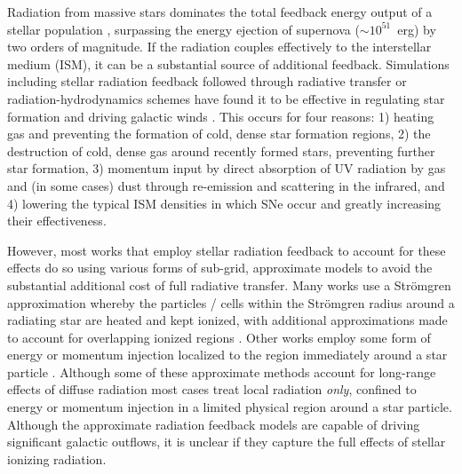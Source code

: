 \documentclass[twocolumn]{aastex62}
\begin{document}
Radiation from massive stars dominates the total feedback energy output of a stellar population \citep[e.g.][]{Leitherer1999,Agertz2013}, surpassing the energy ejection of supernova ($\sim 10^{51}$~erg) by two orders of magnitude. If the radiation couples effectively to the interstellar medium (ISM), it can be a substantial source of additional feedback. %
Simulations including stellar radiation feedback followed through radiative transfer or radiation-hydrodynamics schemes have found it to be effective in regulating star formation and driving galactic winds \citep[e.g.][]{WiseAbel2012,Kim2013a,Sales2014,Oshea2015,Rosdahl2015,Ocvirk2015,Pawlik2015,Peters2017}. This occurs for four reasons: 1) heating gas and preventing the formation of cold, dense star formation regions, 2) the destruction of cold, dense gas around recently formed stars, preventing further star formation, 3) momentum input by direct absorption of UV radiation by gas and (in some cases) dust through re-emission and scattering in the infrared, and 4) lowering the typical ISM densities in which SNe occur and greatly increasing their effectiveness. %

However, most works that employ stellar radiation feedback to account for these effects do so using various forms of sub-grid, approximate models to avoid the substantial additional cost of full radiative transfer. Many works use a Str{\"o}mgren approximation whereby the particles / cells within the Str{\"o}mgren radius around a radiating star are heated and kept ionized, with additional approximations made to account for overlapping ionized regions \citep[e.g.][]{HQM2011,Hu2016,Hu2017}. Other works employ some form of energy or momentum injection localized to the region immediately around a star particle \citep[e.g.][(\textit{need more})]{Agertz2013,Roskar2014,Ceverino2014,Forbes2016}. Although some of these approximate methods account for long-range effects of diffuse radiation \citep{HQM2012,Hopkins2018} most cases treat local radiation {\it only}, confined to energy or momentum injection in a limited physical region around a star particle. Although the approximate radiation feedback models are capable of driving significant galactic outflows, it is unclear if they capture the full effects of stellar ionizing radiation. 
\end{document}
